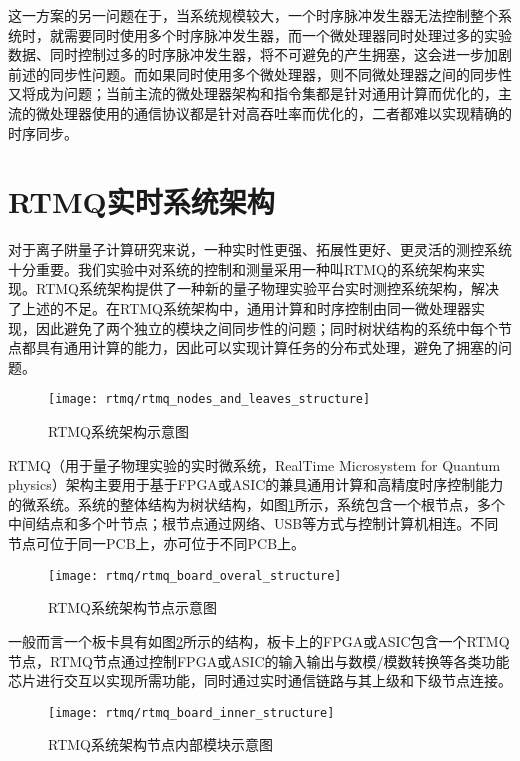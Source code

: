 这一方案的另一问题在于，当系统规模较大，一个时序脉冲发生器无法控制整个系统时，就需要同时使用多个时序脉冲发生器，而一个微处理器同时处理过多的实验数据、同时控制过多的时序脉冲发生器，将不可避免的产生拥塞，这会进一步加剧前述的同步性问题。而如果同时使用多个微处理器，则不同微处理器之间的同步性又将成为问题；当前主流的微处理器架构和指令集都是针对通用计算而优化的，主流的微处理器使用的通信协议都是针对高吞吐率而优化的，二者都难以实现精确的时序同步。

\section[RTMQ实时系统架构]{RTMQ实时系统架构}

对于离子阱量子计算研究来说，一种实时性更强、拓展性更好、更灵活的测控系统十分重要。我们实验中对系统的控制和测量采用一种叫RTMQ的系统架构来实现。RTMQ系统架构提供了一种新的量子物理实验平台实时测控系统架构，解决了上述的不足。在RTMQ系统架构中，通用计算和时序控制由同一微处理器实现，因此避免了两个独立的模块之间同步性的问题；同时树状结构的系统中每个节点都具有通用计算的能力，因此可以实现计算任务的分布式处理，避免了拥塞的问题。

\begin{figure}
    \centering
    \caption[RTMQ系统架构示意图]{RTMQ系统架构示意图\label{fig:rtmq_nodes_and_leaves_structure}}
    \texttt{[image: rtmq/rtmq\_nodes\_and\_leaves\_structure]}
\end{figure}

RTMQ（用于量子物理实验的实时微系统，RealTime Microsystem for Quantum physics）架构主要用于基于FPGA或ASIC的兼具通用计算和高精度时序控制能力的微系统。系统的整体结构为树状结构，如图\ref{fig:rtmq_nodes_and_leaves_structure}所示，系统包含一个根节点，多个中间结点和多个叶节点；根节点通过网络、USB等方式与控制计算机相连。不同节点可位于同一PCB上，亦可位于不同PCB上。

\begin{figure}
    \centering
    \caption[RTMQ系统架构节点示意图]{RTMQ系统架构节点示意图\label{fig:rtmq_board_overal_structure}}
    \texttt{[image: rtmq/rtmq\_board\_overal\_structure]}
\end{figure}

一般而言一个板卡具有如图\ref{fig:rtmq_board_overal_structure}所示的结构，板卡上的FPGA或ASIC包含一个RTMQ节点，RTMQ节点通过控制FPGA或ASIC的输入输出与数模/模数转换等各类功能芯片进行交互以实现所需功能，同时通过实时通信链路与其上级和下级节点连接。

\begin{figure}
    \centering
    \caption[RTMQ系统架构节点内部模块示意图]{RTMQ系统架构节点内部模块示意图\label{fig:rtmq_board_inner_structure}}
    \texttt{[image: rtmq/rtmq\_board\_inner\_structure]}
\end{figure}

